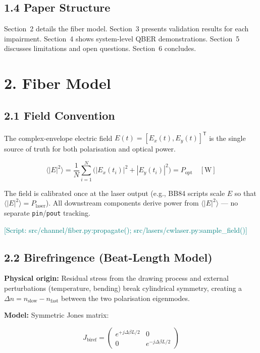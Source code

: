 \documentclass[11pt,a4paper]{article}
\newcommand{\scriptref}[1]{\textcolor{teal}{[Script: #1]}}
\begin{document}
\subsection{1.4 Paper Structure}
Section~2 details the fiber model.  Section~3 presents validation results
for each impairment.  Section~4 shows system-level QBER demonstrations.
Section~5 discusses limitations and open questions.  Section~6 concludes.

\section{2. Fiber Model}
\label{sec:model}

\subsection{2.1 Field Convention}
\label{sec:field-convention}
The complex-envelope electric field $E(t) = [E_x(t), E_y(t)]^\mathsf{T}$ is
the single source of truth for both polarisation and optical power.

\begin{equation}
  \langle |E|^2 \rangle = \frac{1}{N}\sum_{i=1}^N
  \bigl(|E_x(t_i)|^2 + |E_y(t_i)|^2\bigr) = P_{\text{opt}} \quad [\text{W}]
\end{equation}

The field is calibrated once at the laser output (e.g., BB84 scripts scale
$E$ so that $\langle|E|^2\rangle = P_{\text{laser}}$).  All downstream
components derive power from $\langle|E|^2\rangle$ --- no separate
\texttt{pin}/\texttt{pout} tracking.

\scriptref{src/channel/fiber.py:propagate(); src/lasers/cwlaser.py:sample\_field()}

\subsection{2.2 Birefringence (Beat-Length Model)}
\label{sec:biref}

\textbf{Physical origin:} Residual stress from the drawing process and
external perturbations (temperature, bending) break cylindrical symmetry,
creating a $\Delta n = n_{\text{slow}} - n_{\text{fast}}$ between the two
polarisation eigenmodes.

\textbf{Model:} Symmetric Jones matrix:

\begin{equation}
  J_{\text{biref}} = \begin{pmatrix}
    e^{+j\Delta\beta L/2} & 0 \\
    0 & e^{-j\Delta\beta L/2}
  \end{pmatrix}
\end{equation}
\end{document}
